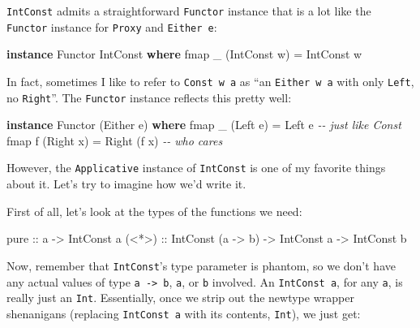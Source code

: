 \documentclass[]{article}
\newenvironment{Shaded}{}{}
\newcommand{\CommentTok}[1]{\textcolor[rgb]{0.38,0.63,0.69}{\textit{#1}}}
\newcommand{\DataTypeTok}[1]{\textcolor[rgb]{0.56,0.13,0.00}{#1}}
\newcommand{\FunctionTok}[1]{\textcolor[rgb]{0.02,0.16,0.49}{#1}}
\newcommand{\KeywordTok}[1]{\textcolor[rgb]{0.00,0.44,0.13}{\textbf{#1}}}
\newcommand{\NormalTok}[1]{#1}
\newcommand{\OtherTok}[1]{\textcolor[rgb]{0.00,0.44,0.13}{#1}}
\begin{document}
\texttt{IntConst} admits a straightforward \texttt{Functor} instance that is a
lot like the \texttt{Functor} instance for \texttt{Proxy} and
\texttt{Either\ e}:

\begin{Shaded}
\begin{Highlighting}[]
\KeywordTok{instance} \DataTypeTok{Functor} \DataTypeTok{IntConst} \KeywordTok{where}
    \FunctionTok{fmap}\NormalTok{ \_ (}\DataTypeTok{IntConst}\NormalTok{ w) }\OtherTok{=} \DataTypeTok{IntConst}\NormalTok{ w}
\end{Highlighting}
\end{Shaded}

In fact, sometimes I like to refer to \texttt{Const\ w\ a} as ``an
\texttt{Either\ w\ a} with only \texttt{Left}, no \texttt{Right}''. The
\texttt{Functor} instance reflects this pretty well:

\begin{Shaded}
\begin{Highlighting}[]
\KeywordTok{instance} \DataTypeTok{Functor}\NormalTok{ (}\DataTypeTok{Either}\NormalTok{ e) }\KeywordTok{where}
    \FunctionTok{fmap}\NormalTok{ \_ (}\DataTypeTok{Left}\NormalTok{ e)  }\OtherTok{=} \DataTypeTok{Left}\NormalTok{ e        }\CommentTok{{-}{-} just like \textquotesingle{}Const\textquotesingle{}}
    \FunctionTok{fmap}\NormalTok{ f (}\DataTypeTok{Right}\NormalTok{ x) }\OtherTok{=} \DataTypeTok{Right}\NormalTok{ (f x)   }\CommentTok{{-}{-} who cares}
\end{Highlighting}
\end{Shaded}

However, the \texttt{Applicative} instance of \texttt{IntConst} is one of my
favorite things about it. Let's try to imagine how we'd write it.

First of all, let's look at the types of the functions we need:

\begin{Shaded}
\begin{Highlighting}[]
\FunctionTok{pure}\OtherTok{  ::}\NormalTok{ a }\OtherTok{{-}>} \DataTypeTok{IntConst}\NormalTok{ a}
\OtherTok{(<*>) ::} \DataTypeTok{IntConst}\NormalTok{ (a }\OtherTok{{-}>}\NormalTok{ b) }\OtherTok{{-}>} \DataTypeTok{IntConst}\NormalTok{ a }\OtherTok{{-}>} \DataTypeTok{IntConst}\NormalTok{ b}
\end{Highlighting}
\end{Shaded}

Now, remember that \texttt{IntConst}'s type parameter is phantom, so we don't
have any actual values of type \texttt{a\ -\textgreater{}\ b}, \texttt{a}, or
\texttt{b} involved. An \texttt{IntConst\ a}, for any \texttt{a}, is really just
an \texttt{Int}. Essentially, once we strip out the newtype wrapper shenanigans
(replacing \texttt{IntConst\ a} with its contents, \texttt{Int}), we just get:
\end{document}

